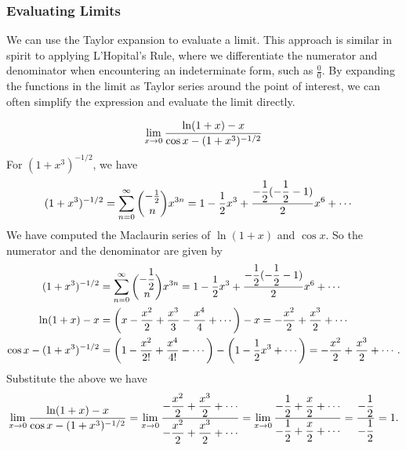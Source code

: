 \subsubsection{Evaluating Limits}
We can use the Taylor expansion to evaluate a limit. This approach is similar in spirit to applying L'Hopital's Rule, where we differentiate the numerator and denominator when encountering an indeterminate form, such as $\frac{0}{0}$. By expanding the functions in the limit as Taylor series around the point of interest, we can often simplify the expression and evaluate the limit directly.
\begin{ex}    
\[\displaystyle\lim_{x \to 0} \dfrac{\ln(1+x)- x}{\cos x - (1+x^3)^{-1/2}}\]
    For $(1+x^3)^{-1/2}$, we have
    \begin{align*}
    (1+x^3)^{-1/2} &= \displaystyle\sum_{n=0}^\infty {-\frac{1}{2} \choose n} x^{3n} = 1 - \dfrac{1}{2} x^3 + \dfrac{-\dfrac{1}{2}(-\dfrac{1}{2}-1)}{2} x^6 + \cdots 
    \end{align*}
    We have computed the Maclaurin series of $\ln(1+x)$ and $\cos x$. So the numerator and the denominator are given by
    \begin{align*}
    (1+x^3)^{-1/2} &= \displaystyle\sum_{n=0}^\infty {-\dfrac{1}{2} \choose n} x^{3n} = 1 - \dfrac{1}{2} x^3 + \dfrac{-\dfrac{1}{2}(-\dfrac{1}{2}-1)}{2} x^6 + \cdots \\
    \ln(1+x) - x &= \left( x - \dfrac{x^2}{2} + \dfrac{x^3}{3} - \dfrac{x^4}{4} + \cdots \right) - x = - \dfrac{x^2}{2} + \dfrac{x^3}{2} + \cdots \\
    \cos x - (1+x^3)^{-1/2} &= \left( 1 - \dfrac{x^2}{2!} + \dfrac{x^4}{4!} - \cdots \right) - \left( 1 - \dfrac{1}{2} x^3 + \cdots \right) = - \dfrac{x^2}{2} + \dfrac{x^3}{2} + \cdots.        
    \end{align*}
    Substitute the above we have
    \[\displaystyle\lim_{x \to 0} \dfrac{\ln(1+x) - x}{\cos x - (1+x^3)^{-1/2}} = \displaystyle\lim_{x \to 0} \dfrac{ - \dfrac{x^2}{2} + \dfrac{x^3}{2} + \cdots}{ - \dfrac{x^2}{2} + \dfrac{x^3}{2} + \cdots} = \displaystyle\lim_{x \to 0} \dfrac{ - \dfrac{1}{2} + \dfrac{x}{2} + \cdots}{ - \dfrac{1}{2} + \dfrac{x}{2} + \cdots} = \dfrac{ - \dfrac{1}{2}}{ - \dfrac{1}{2}} = 1.\]
\end{ex}
